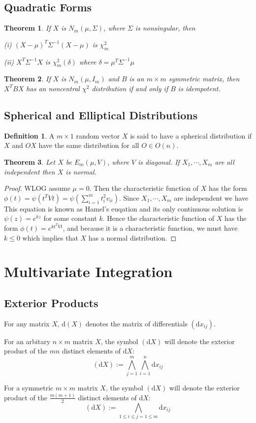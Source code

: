 \documentclass{article}
\newtheorem{Thm}{Theorem}[section]
\theoremstyle{definition}
\newtheorem{Def}{Definition}[section]
\begin{document}
\subsection{Quadratic Forms}
\begin{Thm}
If $X$ is $N_m(\mu,\Sigma)$, where $\Sigma$ is nonsingular, then \par
(i) $(X-\mu)^T\Sigma^{-1}(X-\mu)$ is $\chi^2_m$ \par 
(ii) $X^T\Sigma^{-1}X$ is $\chi^2_m(\delta)$ where $\delta=\mu^T\Sigma^{-1}\mu$
\end{Thm}

\begin{Thm}
    If $X$ is $N_m(\mu,I_m)$ and $B$ is an $m\times m$ symmetric matrix, then $X^TBX$ has an noncentral $\chi^2$ distribution if and only if $B$ is idempotent.
\end{Thm}

\subsection{Spherical and Elliptical Distributions}
\begin{Def}
    A $m\times 1$ random vector $X$ is said to have a spherical distribution if $X$ and $OX$ have the same distribution for all $O\in O(n)$.
\end{Def}

\begin{Thm}
    Let $X$ be $E_m(\mu,V)$, where $V$ is diagonal. If $X_1,\cdots,X_m$ are all independent then $X$ is normal.
\end{Thm}
\begin{proof}
    WLOG assume $\mu=0$. Then the characteristic function of $X$ has the form $\phi(t)=\psi(t^TVt)=\psi(\sum_{i=1}^m t_i^2v_{ii})$.
Since $X_1,\cdots,X_m$ are independent we have $ $
This equation is known as Hamel's euqation and its only continuous solution is $\psi(z)=e^{kz}$ for some constant $k$.
Hence the characteristic function of $X$ has the form $\phi(t)=e^{kt^TVt}$, and because it is a characteristic function, we must have $k\le 0$ which implies that $X$ has a normal distribution.
\end{proof}


\section{Multivariate Integration}
\subsection{Exterior Products}
For any matrix $X$, $\mathrm{d}(X)$ denotes the matrix of differentials $(\mathrm{d}x_{ij})$.\par 
For an arbitary $n\times m$ matrix $X$, the symbol $(\mathrm{d}X)$ will denote the exterior product of the $mn$ distinct elements of $\mathrm{d}X$:
\[(\mathrm{d}X):=\bigwedge _{j=1}^m \bigwedge _{i=1}^n \mathrm{d}x_{ij}\]\par 
For a symmetric $m\times m$ matrix $X$, the symbol $(\mathrm{d}X)$ will denote the exterior product of the $\frac{m(m+1)}{2}$ distinct elements of $\mathrm{d}X$:
\[(\mathrm{d}X):=\bigwedge _{1\le i\le j=1\le m} \mathrm{d}x_{ij}\]\par 
\end{document}
